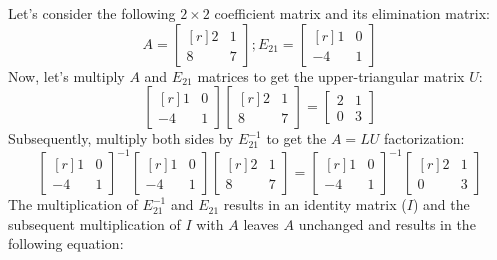 \documentclass[../main.tex]{subfiles}
\begin{document}
Let's consider the following \(2 \times 2\) coefficient matrix and its elimination matrix:
\[
    A
    =
    \begin{bmatrix*}[r]
        2 & 1 \\
        8 & 7
    \end{bmatrix*};
    E_{21}
    =
    \begin{bmatrix*}[r]
        1 & 0 \\
        -4 & 1
    \end{bmatrix*}
\]
Now, let's multiply \(A\) and \(E_{21}\) matrices to get the upper-triangular matrix \(U\):
\[
    \begin{bmatrix*}[r]
        1 & 0 \\
        -4 & 1
    \end{bmatrix*}
    \begin{bmatrix*}[r]
        2 & 1 \\
        8 & 7
    \end{bmatrix*}
    =
    \begin{bmatrix*}
        2 & 1 \\
        0 & 3
    \end{bmatrix*}
\]
Subsequently, multiply both sides by \(E_{21}^{-1}\) to get the \(A = LU\) factorization:
\[
    \begin{bmatrix*}[r]
        1 & 0 \\
        -4 & 1
    \end{bmatrix*}^{-1}
    \begin{bmatrix*}[r]
        1 & 0 \\
        -4 & 1
    \end{bmatrix*}
    \begin{bmatrix*}[r]
        2 & 1 \\
        8 & 7
    \end{bmatrix*}
    =
    \begin{bmatrix*}[r]
        1 & 0 \\
        -4 & 1
    \end{bmatrix*}^{-1}
    \begin{bmatrix*}[r]
        2 & 1 \\
        0 & 3
    \end{bmatrix*}
\]
The multiplication of \(E_{21}^{-1}\) and \(E_{21}\) results in an identity matrix (\(I\)) and the subsequent multiplication of \(I\) with \(A\) leaves \(A\) unchanged and results in the following equation:
\end{document}
